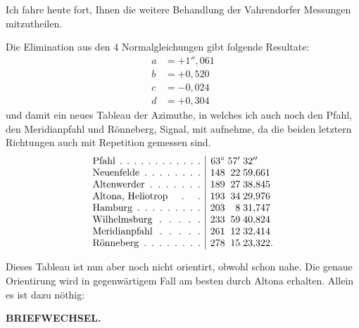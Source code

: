Ich fahre heute fort, Ihnen die weitere Behandlung der Vahrendorfer Messungen mitzutheilen.

Die Elimination aus den 4 Normalgleichungen gibt folgende Resultate:
\[
\begin{aligned}
 a&=+1''{,}061\\
 b&=+0{,}520\\
 c&=-0{,}024\\
 d&=+0{,}304
\end{aligned}
\]
und damit ein neues Tableau der Azimuthe, in welches ich auch noch den Pfahl, den Meridianpfahl und Rönneberg, Signal, mit aufnehme, da die beiden letztern Richtungen auch mit Repetition gemessen sind.
\[
\begin{array}{@{}l|r@{\;}r@{\;}l@{}}
 \text{\hbox to 11em{Pfahl\hfil.\hfil.\hfil.\hfil.\hfil.\hfil.\hfil.\hfil.\hfil.\hfil.\hfil.\hfil.}}&63^\circ&57'&32''\\
 \text{\hbox to 11em{Neuenfelde\hfil.\hfil.\hfil.\hfil.\hfil.\hfil.\hfil.\hfil.}}&148&22&59{,}661\\
 \text{\hbox to 11em{Altenwerder\hfil.\hfil.\hfil.\hfil.\hfil.\hfil.\hfil.}}&189&27&38{,}845\\
 \text{\hbox to 11em{Altona, Heliotrop\hfil.\hfil.}}&193&34&29{,}976\\
 \text{\hbox to 11em{Hamburg\hfil.\hfil.\hfil.\hfil.\hfil.\hfil.\hfil.\hfil.\hfil.}}&203&8&31{,}747\\
 \text{\hbox to 11em{Wilhelmsburg\hfil.\hfil.\hfil.\hfil.\hfil.}}&233&59&40{,}824\\
 \text{\hbox to 11em{Meridianpfahl\hfil.\hfil.\hfil.\hfil.\hfil.}}&261&12&32{,}414\\
 \text{\hbox to 11em{Rönneberg\hfil.\hfil.\hfil.\hfil.\hfil.\hfil.\hfil.\hfil.}}&278&15&23{,}322.
\end{array}
\]

Dieses Tableau ist nun aber noch nicht orientirt, obwohl schon nahe. Die genaue Orientirung wird in gegenwärtigem Fall am besten durch Altona erhalten. Allein es ist dazu nöthig:

\par\clearpage
\noindent{}\hfill{\small\textbf{BRIEFWECHSEL.}}\hfill\null\par\medskip

